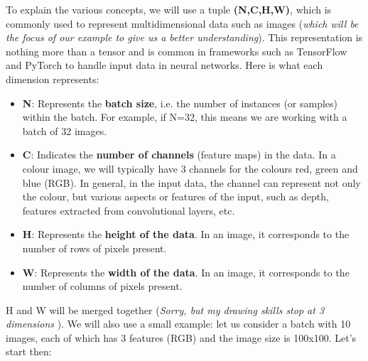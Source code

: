 To explain the various concepts, we will use a tuple \textbf{(N,C,H,W)}, which is commonly used to represent multidimensional data such as images (\textit{which will be the focus of our example to give us a better understanding}). This representation is nothing more than a tensor and is common in frameworks such as TensorFlow and PyTorch to handle input data in neural networks. Here is what each dimension represents:
\begin{itemize}
    \item \textbf{N}: Represents the \textbf{batch size}, i.e. the number of instances (or samples) within the batch. For example, if N=32, this means we are working with a batch of 32 images.
    \item \textbf{C}: Indicates the \textbf{number of channels} (feature maps) in the data. In a colour image, we will typically have 3 channels for the colours red, green and blue (RGB). In general, in the input data, the channel can represent not only the colour, but various aspects or features of the input, such as depth, features extracted from convolutional layers, etc.
    \item \textbf{H}: Represents the \textbf{height of the data}. In an image, it corresponds to the number of rows of pixels present.
    \item \textbf{W}: Represents the \textbf{width of the data}. In an image, it corresponds to the number of columns of pixels present.
\end{itemize}
H and W will be merged together (\textit{Sorry, but my drawing skills stop at 3 dimensions \faSadTear[regular]}).
We will also use a small example: let us consider a batch with 10 images, each of which has 3 features (RGB) and the image size is 100x100. Let's start then:


